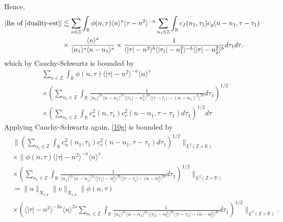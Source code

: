 \documentclass[12pt,reqno]{amsart}
\numberwithin{equation}{section}  %
\numberwithin{figure}{section}
\newcommand{\rr}{\mathbb{R}}
\newcommand{\zz}{\mathbb{Z}}
\theoremstyle{plain}
\theoremstyle{definition}
\theoremstyle{remark}
\begin{document}
%
%
Hence, 
%
%
\begin{equation}
  \label{pre-fubini-int-form}
	\begin{split}
    |\text{lhs of} \ \eqref{duality-est}|
	& \lesssim \sum_{n \in \zz} \int_{\rr} \phi(n, \tau) \langle n \rangle^s \langle \tau - n^{2} \rangle^{-a}
  \sum_{n_1 \in \zz}
  \int_{\rr} c_f(n_1, \tau_1)
		c_g(n - n_1, \tau - \tau_1 )
		\\
    & \times \frac{\langle n \rangle ^{s}}{\langle n_{1} \rangle ^{s} \langle
    n-n_{1} \rangle ^{s}} \times \frac{1}{\langle |\tau| - n^{2} \rangle
    ^{b}\langle |\tau_{1}|-n_{1}^{2} \rangle ^{-b}\langle | \tau|-n_{2}^{2}
    \rangle ^{b}} d \tau_1 d \tau.
	\end{split}
\end{equation}
%
%
which by Cauchy-Schwartz is bounded by
%
%
\begin{equation}
	\label{10g}
	\begin{split}
    & \sum_{n \in \zz} \int_{\rr} \phi(n, \tau) \langle | \tau | - n^{2} \rangle
    ^{-a} \langle n \rangle ^{s}
    \\
    & \times \left( \sum_{n_{1} \in \zz} \int_{\rr}
    \frac{1}{\langle n_{1} \rangle ^{2s} \langle n-n_{1} \rangle ^{2s} \langle |
    \tau_{1} | - n_{1}^{2}\rangle ^{2b} \langle | \tau - \tau_{1} | -
    (n - n_{1})^{2} \rangle ^{2b}} d \tau_{1} \right)^{1/2}
    \\
    & \times \left( \sum_{n_{1} \in \zz} \int_{\rr} c_{u}^{2}(n, \tau_{1})
    c_{v}^{2}(n - n_{1}, \tau - \tau_{1}) d \tau_{1} \right)^{1/2} d \tau
  \end{split}
\end{equation}
%
%
Applying Cauchy-Schwartz again, \eqref{10g} is bounded by
%
%
\begin{equation*}
  \begin{split}
  & \|\left( \sum_{n_{1} \in \zz }\int_{\rr } c_{u}^{2}(n_1, \tau_1)
  c_{v}^{2} (n - n_1, \tau - \tau_{1} ) d \tau_1  \right)^{1/2} \|_{L^{2}(\zz \times
		\rr)}
		\\
    & \times  \|\phi(n, \tau) \langle | \tau | - n^{2} \rangle ^{-a} \langle n
    \rangle ^{s}
		\\
    & \times \left( \sum_{n_{1} \in \zz} \int_{\rr} \frac{1}{ \langle n_{1}
    \rangle ^{2s} \langle n-n_{1} \rangle ^{2s} \langle | \tau_{1}|-n_{1}^{2}
    \rangle^{2b} \langle  |\tau -
    \tau_{1} | -(n - n_{1}^{2}
    \rangle^{2b} } d \tau_1 \right)^{1/2} \|_{L^2(\zz \times \rr)}
		\\
    & = \|u\|_{X_{s,b}} \|v\|_{X_{s,b}} \label{holder-term}
     \|\phi(n, \tau)     \\
    & \times \left( \langle | \tau | - n^{2} \rangle ^{-2a} \langle n
    \rangle ^{2s}
\sum_{n_{1} \in \zz} \int_{\rr} \frac{1}{ \langle n_{1} \rangle ^{2s} \langle
n-n_{1} \rangle ^{2s}  \langle | \tau_{1}|-n_{1}^{2} \rangle^{2b} \langle  |\tau -
    \tau_{1} | -(n - n_{1}^{2}
    \rangle^{2b} } d \tau_1 \right)^{1/2} \|_{L^2(\zz \times \rr)}.
  \end{split}
\end{equation*}
\end{document}
